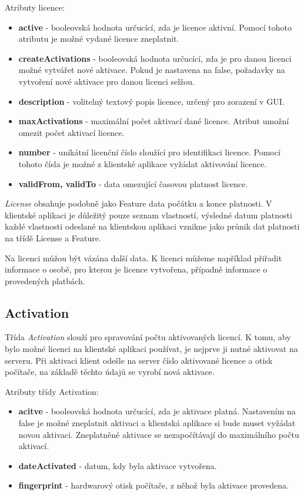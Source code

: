 Atributy licence:

\begin{itemize}
  \item \textbf{active} - booleovská hodnota určucící, zda je licence aktivní.
  Pomocí tohoto atributu je možné vydané licence zneplatnit.
  \item \textbf{createActivations} - booleovská hodnota určucící, zda je pro
  danou licenci možné vytvářet nové aktivace. Pokud je nastavena na false,
  požadavky na vytvoření nové aktivace pro danou licenci selžou.
  \item \textbf{description} - volitelný textový popis licence, určený pro
  zorazení v \gls{GUI}.
  \item \textbf{maxActivations} - maximální počet aktivací dané licence. Atribut
  umožní omezit počet aktivací licence.
  \item \textbf{number} - unikátní licenční číslo sloužící pro identifikaci
  licence. Pomocí tohoto čísla je možné z klientské aplikace vyžádat aktivování
  licence.
  \item \textbf{validFrom, validTo} - data omezující časovou platnost licence.
\end{itemize}

\textit{License} obsahuje podobně jako Feature data počátku a konce platnosti. V
klientské aplikaci je důležitý pouze seznam vlastností, výsledné datum platnosti
každé vlastnosti odeslané na klientskou aplikaci vznikne jako průnik dat
platnosti na třídě License a Feature.

Na licenci můžou být vázána další data. K licenci můžeme například přiřadit
informace o osobě, pro kterou je licence vytvořena, případně informace o
provedených platbách.


\subsection*{Activation}

Třída \textit{Activation} slouží pro spravování počtu aktivovaných licencí. K
tomu, aby bylo možné licenci na klientské aplikaci používat, je nejprve ji nutné aktivovat
na serveru. Při aktivaci klient odešle na server číslo aktivované licence a
otisk počítače, na základě těchto údajů se vyrobí nová aktivace.

Atributy třídy Activation:

\begin{itemize}
  \item \textbf{acitve} - booleovská hodnota určucící, zda je aktivace platná.
  Nastavením na false je možné zneplatnit aktivaci a klientská aplikace si bude
  muset vyžádat novou aktivaci. Zneplatněné aktivace se nezapočítávají do
  maximálního počtu aktivací.
  \item \textbf{dateActivated} - datum, kdy byla aktivace vytvořena.
  \item \textbf{fingerprint} - hardwarový otisk počítače, z něhož byla aktivace
  provedena.
\end{itemize}

